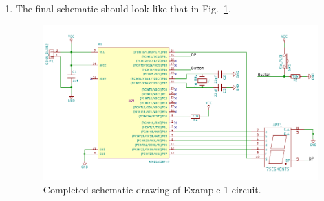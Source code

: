 \documentclass[12pt,letterpaper]{scrartcl}
\begin{document}
\begin{enumerate}
	\item The final schematic should look like that in Fig.~\ref{fig:example1-schematic-final}.
		\begin{figure}[h]
			\centering
			\includegraphics{example1-schematic-final}
			\caption{Completed schematic drawing of Example 1 circuit.}
			\label{fig:example1-schematic-final}
		\end{figure}		
\end{enumerate}
\end{document}
